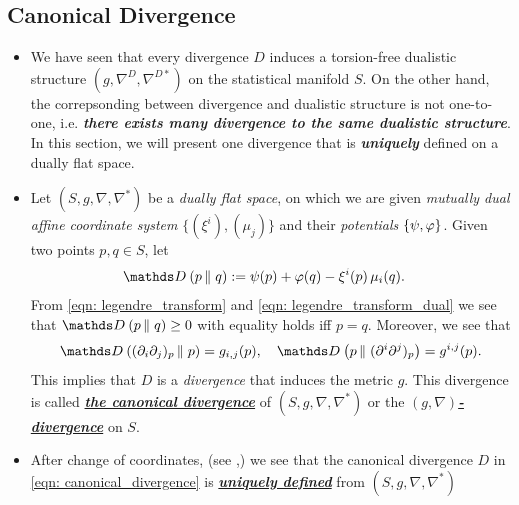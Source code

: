 \documentclass[11pt]{article}
\begin{document}
\subsection{Canonical Divergence}
\begin{itemize}
\item \begin{remark}
We have seen that every divergence $D$ induces a torsion-free dualistic structure $(g, \nabla^{D}, \nabla^{D*})$ on the statistical manifold $S$. On the other hand, the correpsonding between divergence and dualistic structure is not one-to-one, i.e. \emph{\textbf{there exists many divergence to the same dualistic structure}}. In this section, we will present one divergence that is \emph{\textbf{uniquely}} defined on a dually flat space.
\end{remark}

\item \begin{definition}
Let $(S, g, \nabla, \nabla^{*})$ be a \emph{dually flat space}, on which we are given \emph{mutually dual affine coordinate system} $\{(\xi^i), (\mu_j)\}$ and their \textit{potentials} $\left\{\psi, \varphi\right\}$. Given two points $p, q \in S$, let 
\begin{align}
\divg{}{p}{q} &:= \psi(p) + \varphi(q) -  \xi^{i}(p)\,\mu_i(q). \label{eqn: canonical_divergence}
\end{align} From \eqref{eqn: legendre_transform} and \eqref{eqn: legendre_transform_dual} we see that $\divg{}{p}{q} \ge 0$ with equality holds iff $p=q$. Moreover, we see that
\begin{align}
\divg{}{(\partial_i\partial_j)_p}{p} = g_{i,j}(p), \quad \divg{}{p}{(\partial^i\partial^j)_p} = g^{i,j}(p). \label{eqn: canonical_divergence_metric}
\end{align} This implies that $D$ is a \emph{divergence} that induces the metric $g$. This divergence is called \underline{\emph{\textbf{the canonical divergence}}} of $(S, g, \nabla, \nabla^{*})$ or the \underline{\emph{\textbf{$(g, \nabla)$-divergence}}} on $S$.
\end{definition}

\item \begin{remark} After change of coordinates, (see \citep{amari2007methods},) we see that the canonical divergence $D$ in \eqref{eqn: canonical_divergence} is \underline{\emph{\textbf{uniquely defined}}} from  $(S, g, \nabla, \nabla^{*})$
\end{remark}


\end{itemize}
\end{document}

